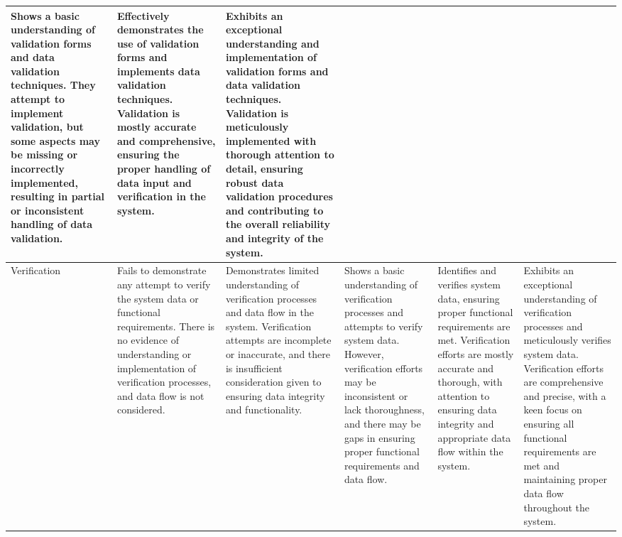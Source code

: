 \documentclass[12pt,a4paper]{article}
\begin{document}
{\begin{longtable}{|L{1.9cm}|L{2.3cm}|L{2.3cm}|L{2.3cm}|L{2.3cm}|L{2.3cm}|}
Shows a basic understanding of validation forms and data validation techniques. They attempt to implement validation, but some aspects may be missing or incorrectly implemented, resulting in partial or inconsistent handling of data validation. &
Effectively demonstrates the use of validation forms and implements data validation techniques. Validation is mostly accurate and comprehensive, ensuring the proper handling of data input and verification in the system. &
Exhibits an exceptional understanding and implementation of validation forms and data validation techniques. Validation is meticulously implemented with thorough attention to detail, ensuring robust data validation procedures and contributing to the overall reliability and integrity of the system. \\ \hline
Verification &
Fails to demonstrate any attempt to verify the system data or functional requirements. There is no evidence of understanding or implementation of verification processes, and data flow is not considered. &
Demonstrates limited understanding of verification processes and data flow in the system. Verification attempts are incomplete or inaccurate, and there is insufficient consideration given to ensuring data integrity and functionality. &
Shows a basic understanding of verification processes and attempts to verify system data. However, verification efforts may be inconsistent or lack thoroughness, and there may be gaps in ensuring proper functional requirements and data flow. &
Identifies and verifies system data, ensuring proper functional requirements are met. Verification efforts are mostly accurate and thorough, with attention to ensuring data integrity and appropriate data flow within the system. &
Exhibits an exceptional understanding of verification processes and meticulously verifies system data. Verification efforts are comprehensive and precise, with a keen focus on ensuring all functional requirements are met and maintaining proper data flow throughout the system. \\ \hline
\end{longtable}

}
\end{document}
